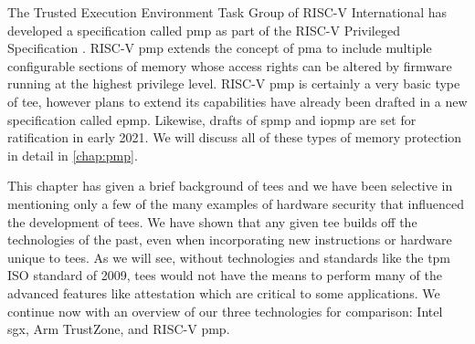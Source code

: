 The Trusted Execution Environment Task Group of RISC-V International has developed a specification called \gls{pmp} as part of the RISC-V Privileged Specification \cite{PrivIsa2019}. RISC-V \gls{pmp} extends the concept of \gls{pma} to include multiple configurable sections of memory whose access rights can be altered by firmware running at the highest privilege level. RISC-V \gls{pmp} is certainly a very basic type of \gls{tee}, however plans to extend its capabilities have already been drafted in a new specification called \gls{epmp}. Likewise, drafts of \gls{spmp} and \gls{iopmp} are set for ratification in early 2021. We will discuss all of these types of memory protection in detail in \autoref{chap:pmp}.

This chapter has given a brief background of \glspl{tee} and we have been selective in mentioning only a few of the many examples of hardware security that influenced the development of \glspl{tee}. We have shown that any given \gls{tee} builds off the technologies of the past, even when incorporating new instructions or hardware unique to \glspl{tee}. As we will see, without technologies and standards like the \gls{tpm} ISO standard of 2009, \glspl{tee} would not have the means to perform many of the advanced features like attestation which are critical to some applications. We continue now with an overview of our three technologies for comparison: Intel \gls{sgx}, Arm TrustZone, and RISC-V \gls{pmp}.


